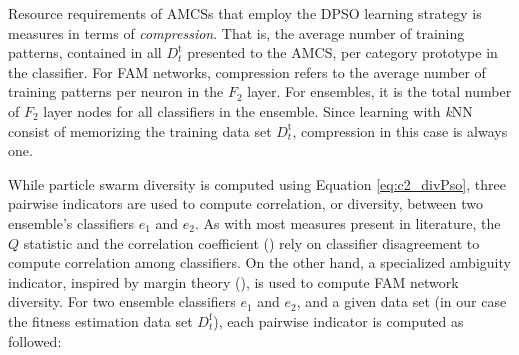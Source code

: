 Resource requirements of AMCSs that employ the DPSO learning strategy is measures in terms of \emph{compression}.
That is, the average number of training patterns, contained in all $D_t^\text{t}$ presented to the AMCS, per category prototype in the classifier.
For FAM networks, compression refers to the average number of training patterns per neuron in the $F_2$ layer.
For ensembles, it is the total number of $F_2$ layer nodes for all classifiers in the ensemble.
Since learning with \textit{k}NN consist of memorizing the training data set $D_t^\text{t}$, compression in this case is always one.

While particle swarm diversity is computed using Equation \ref{eq:c2_divPso}, three pairwise indicators are used to compute correlation, or diversity, between two ensemble's classifiers $e_1$ and $e_2$.
As with most measures present in literature, the $Q$ statistic and the correlation coefficient (\cite{ulas09}) rely on classifier disagreement to compute correlation among classifiers.
On the other hand, a specialized ambiguity indicator, inspired by margin theory (\cite{tang06}), is used to compute FAM network diversity.
For two ensemble classifiers $e_1$ and $e_2$, and a given data set (in our case the fitness estimation data set $D_t^\text{f}$), each pairwise indicator is computed as followed:

